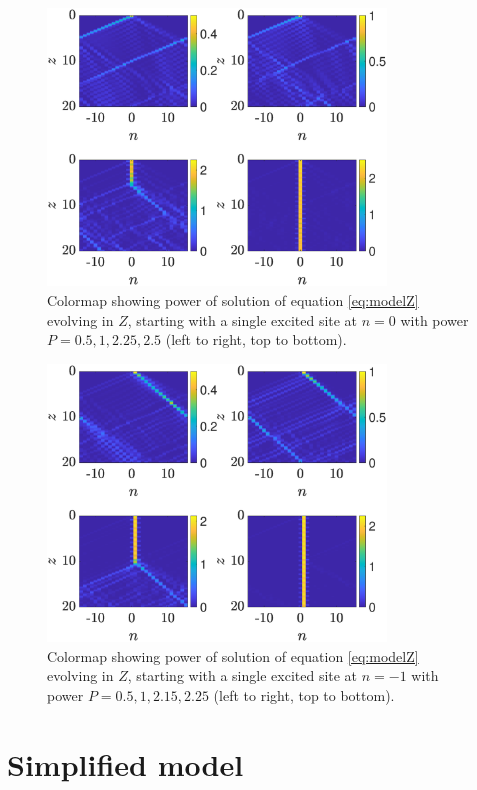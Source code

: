 \documentclass[reprint, amsmath,amssymb,aps,pre]{revtex4-2}
\begin{document}
\begin{figure}
    \centering
    \includegraphics[width=9cm]{timestep0.eps}
    \caption{Colormap showing power of solution of equation \cref{eq:modelZ} evolving in $Z$, starting with a single excited site at $n=0$ with power $P=0.5,1,2.25,2.5$ (left to right, top to bottom). }
    \label{fig:timestep0}
\end{figure}

\begin{figure}
    \centering
    \includegraphics[width=9cm]{timestep1.eps}
    \caption{Colormap showing power of solution of equation \cref{eq:modelZ} evolving in $Z$, starting with a single excited site at $n=-1$ with power $P=0.5,1,2.15,2.25$ (left to right, top to bottom).}
    \label{fig:timestep1}
\end{figure}

\section{Simplified model}
\end{document}
